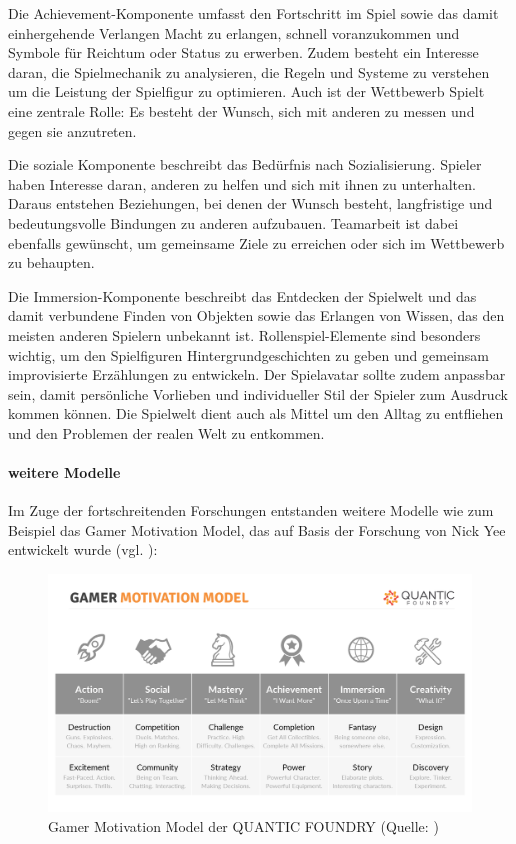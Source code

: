 Die Achievement-Komponente umfasst den Fortschritt im Spiel sowie das damit einhergehende Verlangen Macht zu erlangen, schnell voranzukommen und Symbole für Reichtum oder Status zu erwerben. Zudem besteht ein Interesse daran, die Spielmechanik zu analysieren, die Regeln und Systeme zu verstehen um die Leistung der Spielfigur zu optimieren. Auch ist der Wettbewerb Spielt eine zentrale Rolle: Es besteht der Wunsch, sich mit anderen zu messen und gegen sie anzutreten.

Die soziale Komponente beschreibt das Bedürfnis nach Sozialisierung. Spieler haben Interesse daran, anderen zu helfen und sich mit ihnen zu unterhalten. Daraus entstehen Beziehungen, bei denen der Wunsch besteht, langfristige und bedeutungsvolle Bindungen zu anderen aufzubauen. Teamarbeit ist dabei ebenfalls gewünscht, um gemeinsame Ziele zu erreichen oder sich im Wettbewerb zu behaupten.

Die Immersion-Komponente beschreibt das Entdecken der Spielwelt und das damit verbundene Finden von Objekten sowie das Erlangen von Wissen, das den meisten anderen Spielern unbekannt ist. Rollenspiel-Elemente sind besonders wichtig, um den Spielfiguren Hintergrundgeschichten zu geben und gemeinsam improvisierte Erzählungen zu entwickeln. Der Spielavatar sollte zudem anpassbar sein, damit persönliche Vorlieben und individueller Stil der Spieler zum Ausdruck kommen können. Die Spielwelt dient auch als Mittel um den Alltag zu entfliehen und den Problemen der realen Welt zu entkommen.

\paragraph{weitere Modelle}
Im Zuge der fortschreitenden Forschungen entstanden weitere Modelle wie zum Beispiel das Gamer Motivation Model, das auf Basis der Forschung von Nick Yee entwickelt wurde (vgl. \cite{ludologie_spielertypen_nodate}):

\begin{figure}[ht]
\centering
\includegraphics[width=1\linewidth]{content/pictures/gamer_motivations_model.png}
\caption{Gamer Motivation Model der QUANTIC FOUNDRY (Quelle: \cite{noauthor_quantic_nodate})}
\label{fig:gamer_motivation_model}
\end{figure}

